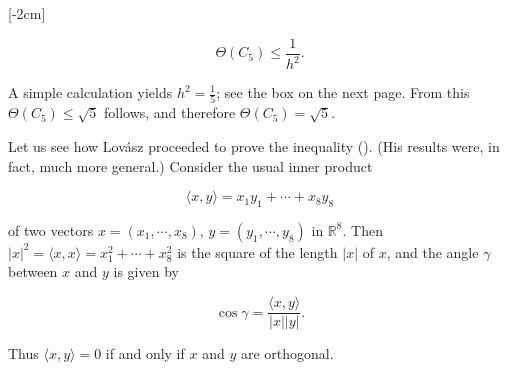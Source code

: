 \documentclass[12pt]{memoir}
\newcommand{\setsecondpagemargins}{
    \clearpage
    \setulmarginsandblock{2cm}{0.5cm}{*}
    \checkandfixthelayout
}
\begin{document}
[-2cm]

\begin{equation}
  \Theta(C_5) \leq \frac{1}{h^2}. \label{four}
\end{equation}

A simple calculation yields $h^2 = \frac{1}{5}$; see the box on the next page. From   
this $\Theta(C_5) \leq \sqrt{5}$ follows, and therefore $\Theta(C_5) = \sqrt{5}$.


\setsecondpagemargins

Let us see how Lov\'asz proceeded to prove the inequality (). (His results 
were, in fact, much more general.) Consider the usual inner product 

\begin{equation*}
  \langle x,y \rangle = x_1y_1 + \dotsb + x_8y_8
\end{equation*}

of two vectors $x = (x_1, \dotsb, x_8)$, $y = (y_1, \dotsb, y_8)$ in $\mathbb{R}^8$.
Then $|x|^2 = \langle x,x \rangle = x_1^2 + \dotsb + x_8^2$ is the square of the length $|x|$
of $x$, and the angle $\gamma$ between $x$ and $y$ is given by

\begin{equation*}
  \cos \gamma = \frac{\langle x,y \rangle}{|x||y|}.
\end{equation*}

Thus $\langle x,y \rangle = 0$ if and only if $x$ and $y$ are orthogonal.\\
\end{document}
